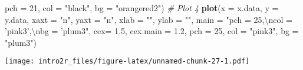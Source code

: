 \documentclass[
]{book}
\newenvironment{Shaded}{\begin{snugshade}}{\end{snugshade}}
\newcommand{\CharTok}[1]{\textcolor[rgb]{0.31,0.60,0.02}{#1}}
\newcommand{\CommentTok}[1]{\textcolor[rgb]{0.56,0.35,0.01}{\textit{#1}}}
\newcommand{\DataTypeTok}[1]{\textcolor[rgb]{0.13,0.29,0.53}{#1}}
\newcommand{\DecValTok}[1]{\textcolor[rgb]{0.00,0.00,0.81}{#1}}
\newcommand{\FloatTok}[1]{\textcolor[rgb]{0.00,0.00,0.81}{#1}}
\newcommand{\KeywordTok}[1]{\textcolor[rgb]{0.13,0.29,0.53}{\textbf{#1}}}
\newcommand{\NormalTok}[1]{#1}
\newcommand{\StringTok}[1]{\textcolor[rgb]{0.31,0.60,0.02}{#1}}
\begin{document}
\begin{Shaded}
\begin{Highlighting}[]
     \DataTypeTok{pch =} \DecValTok{21}\NormalTok{, }\DataTypeTok{col =} \StringTok{"black"}\NormalTok{, }\DataTypeTok{bg =} \StringTok{"orangered2"}\NormalTok{)}
\CommentTok{# Plot 4}
\KeywordTok{plot}\NormalTok{(}\DataTypeTok{x =}\NormalTok{ x.data, }\DataTypeTok{y =}\NormalTok{ y.data, }\DataTypeTok{xaxt =} \StringTok{"n"}\NormalTok{, }\DataTypeTok{yaxt =} \StringTok{"n"}\NormalTok{, }\DataTypeTok{xlab =} \StringTok{""}\NormalTok{, }\DataTypeTok{ylab =} \StringTok{""}\NormalTok{, }\DataTypeTok{main =} \StringTok{"pch = 25,}\CharTok{\textbackslash{}n}\StringTok{col = 'pink3',}\CharTok{\textbackslash{}n}\StringTok{bg = 'plum3"}\NormalTok{, }
     \DataTypeTok{cex=} \FloatTok{1.5}\NormalTok{, }\DataTypeTok{cex.main =} \FloatTok{1.2}\NormalTok{, }
     \DataTypeTok{pch =} \DecValTok{25}\NormalTok{, }\DataTypeTok{col =} \StringTok{"pink3"}\NormalTok{, }\DataTypeTok{bg =} \StringTok{"plum3"}\NormalTok{)}
\end{Highlighting}
\end{Shaded}

\texttt{[image: intro2r\_files/figure-latex/unnamed-chunk-27-1.pdf]}

  
\end{document}
